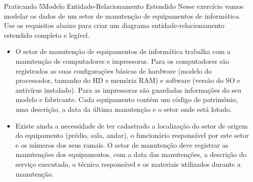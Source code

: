 \documentclass[t]{beamer}
\begin{document}

\begin{ftst}{Praticando 5}{Modelo Entidade-Relacionamento Estendido}
\small
Nesse exercício vamos modelar os dados de um setor de manutenção de equipamentos de informática. Use os requisitos abaixo para criar um diagrama entidade-relacionamento estendido completo e legível.
\footnotesize
\begin{itemize}
    \item O setor de manutenção de equipamentos de informática trabalha com a manutenção de computadores e impressoras. Para os computadores são registrados as suas configurações básicas de hardware (modelo do processador, tamanho do HD e memória RAM) e software (versão do SO e antivírus instalado). Para as impressoras são guardadas informações do seu modelo e fabricante. Cada equipamento contém um código de patrimônio, uma descrição, a data da última manutenção e o setor onde está lotado. 
    \vone
    \item Existe ainda a necessidade de ter cadastrado a localização do setor de origem do equipamento (prédio, sala, andar), o funcionário responsável por este setor e os números dos seus ramais. O setor de manutenção deve registrar as manutenções dos equipamentos, com a data das manutenções, a descrição do serviço executado, o técnico responsável e os materiais utilizados durante a manutenção.
\end{itemize}
\end{ftst}
\end{document}
